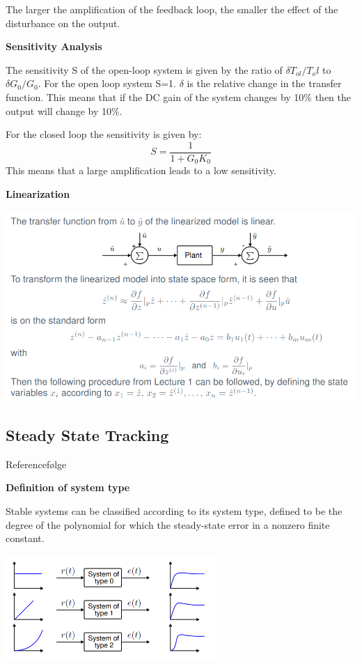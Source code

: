 The larger the amplification of the feedback loop, the smaller the effect of the
disturbance on the output.


\textbf{Sensitivity Analysis}

The sensitivity S of the open-loop system is given by the ratio of $\delta T_{ol}/T_ol$ to $\delta G_0/G_0$.
For the open loop system S=1. $\delta$ is the relative change in the transfer function.
This means that if the DC gain of the system changes by 10\% then the output will change by 10\%.

For the closed loop the sensitivity is given by:
$$S = \frac{1}{1+G_0 K_0}$$
This means that a large amplification leads to a low sensitivity.

\newpage

\textbf{Linearization}

\begin{center}
	\includegraphics[width=\textwidth]{Images/linearization.png}
\end{center}

\subsection{Steady State Tracking}

Referencefølge

\textbf{Definition of system type}

Stable systems can be classified according to its system type, defined to be the
degree of the polynomial
for which the steady-state error in a nonzero finite constant.


\begin{center}
	\includegraphics[width=0.6\textwidth]{Images/systemTypes.png}
\end{center}

